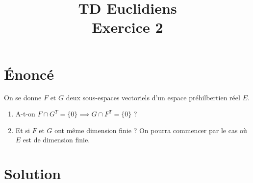 \documentclass[french]{article}
\title{TD Euclidiens\\ Exercice 2}
\date{}
\begin{document}
\maketitle

\section{Énoncé}
On se donne $F$ et $G$ deux sous-espaces vectoriels d'un espace préhilbertien réel $E$.
\begin{enumerate}
	\item A-t-on $F\cap G^T=\{0\}\implies G\cap F^T=\{0\}$ ?
	\item Et si $F$ et $G$ ont même dimension finie ? On pourra commencer par le cas où $E$ est de dimension finie.
\end{enumerate}
\section{Solution}
\end{document}
